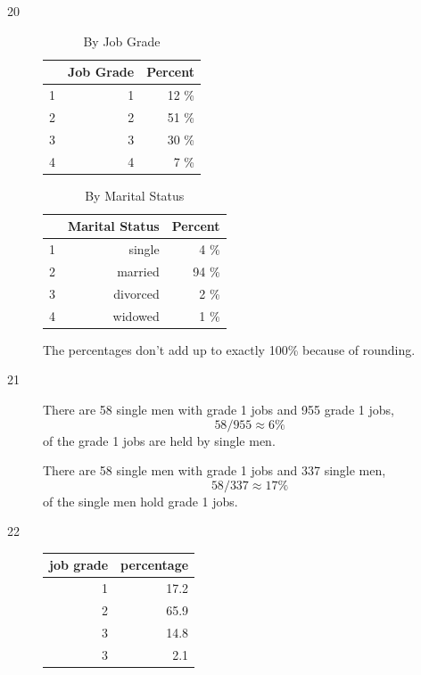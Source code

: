 \documentclass[letterpaper]{exam}
\begin{document}
\begin{description}
      \item[20]
        \begin{table}[H]
          \centering
          \begin{tabular}{rrr}
            \toprule
              & Job Grade & Percent \\
            \midrule
            1 & 1         & 12 \% \\
            2 & 2         & 51 \% \\
            3 & 3         & 30 \% \\
            4 & 4         & 7 \% \\
            \bottomrule
          \end{tabular}
          \caption{By Job Grade}
        \end{table}

        \begin{table}[H]
          \centering
          \begin{tabular}{rrr}
            \toprule
              & Marital Status & Percent \\
            \midrule
            1 & single         & 4 \% \\
            2 & married        & 94 \% \\
            3 & divorced       & 2 \% \\
            4 & widowed        & 1 \% \\
            \bottomrule
          \end{tabular}
          \caption{By Marital Status}
        \end{table}

      The percentages don't add up to exactly 100\% because of rounding.
      
    \item[21]
      There are 58 single men with grade 1 jobs and 955 grade 1 jobs, 
      \[
        58/955 \approx 6 \%
      \]
      of the grade 1 jobs are held by single men.

      There are 58 single men with grade 1 jobs and 337 single men, 
      \[
        58/337 \approx 17 \% 
      \]
      of the single men hold grade 1 jobs.

    \item[22]
      \begin{table}[H]
        \centering
        \begin{tabular}{rr}
          \toprule
          job grade & percentage \\
          \midrule
          1         & 17.2  \\
          2         & 65.9  \\
          3         & 14.8  \\
          3         & 2.1   \\
          \bottomrule
        \end{tabular}
      \end{table}


\end{description}
\end{document}
